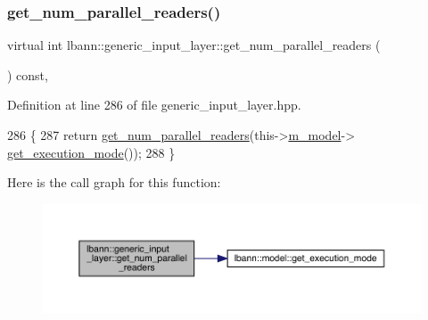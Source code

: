 \subsubsection{\texorpdfstring{get\+\_\+num\+\_\+parallel\+\_\+readers()}{get\_num\_parallel\_readers()}\hspace{0.1cm}{\footnotesize\ttfamily [2/2]}}
{\footnotesize\ttfamily virtual int lbann\+::generic\+\_\+input\+\_\+layer\+::get\+\_\+num\+\_\+parallel\+\_\+readers (\begin{DoxyParamCaption}{ }\end{DoxyParamCaption}) const\hspace{0.3cm}{\ttfamily [inline]}, {\ttfamily [virtual]}}



Definition at line 286 of file generic\+\_\+input\+\_\+layer.\+hpp.


\begin{DoxyCode}
286                                                \{
287     \textcolor{keywordflow}{return} \hyperlink{classlbann_1_1generic__input__layer_a5ed2e13553574ba9ff54565ebc049982}{get\_num\_parallel\_readers}(this->\hyperlink{classlbann_1_1Layer_a3d9315e99574166f2f33e37b572021d2}{m\_model}->
      \hyperlink{classlbann_1_1model_addb40597cf29aa6d31b6a7d09ef48608}{get\_execution\_mode}());
288   \}
\end{DoxyCode}
Here is the call graph for this function\+:\nopagebreak
\begin{figure}[H]
\begin{center}
\leavevmode
\includegraphics[width=350pt]{classlbann_1_1generic__input__layer_a5ed2e13553574ba9ff54565ebc049982_cgraph}
\end{center}
\end{figure}
\mbox{\label{classlbann_1_1generic__input__layer_a68b162bcc5fdfe2bb7279eb5d83cf884}} 
